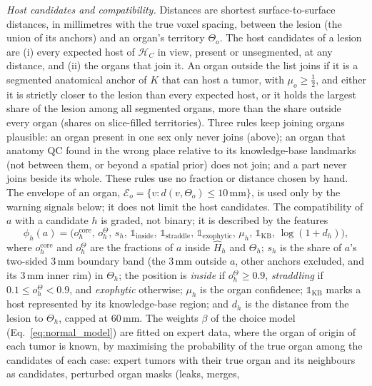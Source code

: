 \documentclass[fleqn,10pt]{olplainarticle}
\begin{document}
\emph{Host candidates and compatibility.} Distances are shortest surface-to-surface distances, in millimetres with the true
voxel spacing, between the lesion (the union of its anchors) and an organ's territory $\Theta_o$. The host candidates of a
lesion are (i) every expected host of $\mathcal{H}_C$ in view, present or unsegmented, at any distance, and (ii) the organs
that join it. An organ outside the list joins if it is a segmented anatomical anchor of $K$ that can host a tumor, with
$\mu_o\ge\tfrac12$, and either it is strictly closer to the lesion than every expected host, or it holds the largest share
of the lesion among all segmented organs, more than the share outside every organ (shares on slice-filled territories).
Three rules keep joining organs plausible: an organ present in one sex only never joins (above); an organ that anatomy QC
found in the wrong place relative to its knowledge-base landmarks (not between them, or beyond a spatial prior) does not
join; and a part never joins beside its whole. These rules use no fraction or distance chosen by hand. The envelope of an organ,
$\mathcal{E}_o=\{v:d(v,\Theta_o)\le10\,\mathrm{mm}\}$, is used only by the warning signals below; it does not limit the host
candidates. The compatibility of $a$ with a
candidate $h$ is graded, not binary; it is described by the features
\begin{equation}
\label{eq:compat}
\phi_h(a)=\bigl(o^{\mathrm{core}}_h,\,o^{\Theta}_h,\,s_h,\,\mathbb{1}_{\mathrm{inside}},\,\mathbb{1}_{\mathrm{straddle}},\,
\mathbb{1}_{\mathrm{exophytic}},\,\mu_h,\,\mathbb{1}_{\mathrm{KB}},\,\log(1+d_h)\bigr),
\end{equation}
where $o^{\mathrm{core}}_h$ and $o^{\Theta}_h$ are the fractions of $a$ inside $\hat H_h$ and $\Theta_h$; $s_h$ is the share
of $a$'s two-sided $3$\,mm boundary band (the $3$\,mm outside $a$, other anchors excluded, and its $3$\,mm inner rim) in
$\Theta_h$; the position is \emph{inside} if $o^{\Theta}_h\ge0.9$, \emph{straddling} if $0.1\le o^{\Theta}_h<0.9$, and
\emph{exophytic} otherwise; $\mu_h$ is the organ confidence; $\mathbb{1}_{\mathrm{KB}}$ marks a host represented by its
knowledge-base region; and $d_h$ is the distance from the lesion to $\Theta_h$, capped at $60$\,mm. The weights $\beta$ of the choice model (Eq.~\eqref{eq:normal_model}) are fitted on expert data,
where the organ of origin of each tumor is known, by maximising the probability of the true organ among the candidates of
each case: expert tumors with their true organ and its neighbours as candidates, perturbed organ masks (leaks, merges,
\end{document}
